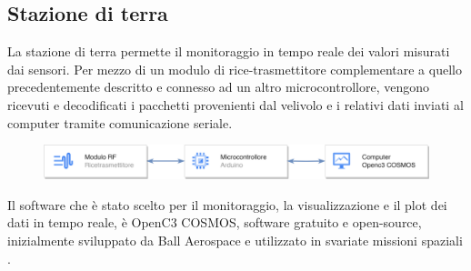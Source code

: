 \documentclass[12pt]{article}
\begin{document}
\subsection*{Stazione di terra}
La stazione di terra permette il monitoraggio in tempo reale dei valori misurati dai sensori. Per mezzo di un modulo di rice-trasmettitore complementare a quello precedentemente descritto e connesso ad un altro microcontrollore, vengono ricevuti e decodificati i pacchetti provenienti dal velivolo e i relativi dati inviati al computer tramite comunicazione seriale. 

\begin{figure}[h]
	\centering
	\includegraphics[width=13cm]{img/GS-Arch}
\end{figure}

\noindent 
Il software che è stato scelto per il monitoraggio, la visualizzazione e il plot dei dati in tempo reale, è OpenC3 COSMOS, software gratuito e open-source, inizialmente sviluppato da Ball Aerospace e utilizzato in svariate missioni spaziali \cite{cosmos}.
\end{document}
